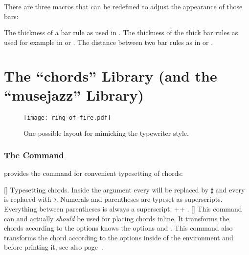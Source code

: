 \documentclass[load-preamble+]{cnltx-doc}
\def\library*#1{``#1''}%
\begin{document}
There are three macros that can be redefined to adjust the appearance of those
bars:
\begin{commands}
  \Default{.02em}
    The thickness of a bar rule as used in .
  \Default{.15em}
    The thickness of the thick bar rules as used for example in
     or .
  \Default{.1em}
    The distance between two bar rules as in  or .
\end{commands}

\clearpage
\part{The \library*{chords} Library (and the \library*{musejazz} Library)}\label{part:chords-library}

\begin{figure}
  \centering
  \texttt{[image: ring-of-fire.pdf]}
  \caption{One possible layout for \leadsheets{} mimicking the typewriter
    style.}
  \label{fig:leadsheet}
\end{figure}

\section{The  Command}

\chords{} provides the command  for convenient
typesetting of chords:

\begin{example}
   
   
\end{example}

\begin{commands}
  []
    Typesetting chords.  Inside the argument every \code{\#} will be replaced
    by $\sharp$ and every  is replaced with $\flat$.  Numerals and
    parentheses are typeset as superscripts.  Everything between parentheses
    is always a superscript: \verbcode++
    .
  []
    This command can and actually \emph{should} be used for placing chords
    inline. It transforms the chords according to the options knows the
    options  and .  This
    command also transforms the chord according to the options inside of the
     environment  and  before
    printing it, see also page~\pageref{cs:writechord}.
\end{commands}
\end{document}
